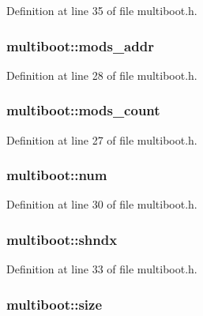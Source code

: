 Definition at line 35 of file multiboot.h.

\hypertarget{structmultiboot_ab498e400b86badc8cd9268e8b911341f}{
\subsubsection[{mods\_\-addr}]{ {\bf multiboot::mods\_\-addr}}}
\label{structmultiboot_ab498e400b86badc8cd9268e8b911341f}


Definition at line 28 of file multiboot.h.

\hypertarget{structmultiboot_abc3e364195feeaf327801564a4e49bd6}{
\subsubsection[{mods\_\-count}]{ {\bf multiboot::mods\_\-count}}}
\label{structmultiboot_abc3e364195feeaf327801564a4e49bd6}


Definition at line 27 of file multiboot.h.

\hypertarget{structmultiboot_ac5a780075eee3041b3c915d32f37d51a}{
\subsubsection[{num}]{ {\bf multiboot::num}}}
\label{structmultiboot_ac5a780075eee3041b3c915d32f37d51a}


Definition at line 30 of file multiboot.h.

\hypertarget{structmultiboot_abb0198fa44cac2b02164410e8cb26621}{
\subsubsection[{shndx}]{ {\bf multiboot::shndx}}}
\label{structmultiboot_abb0198fa44cac2b02164410e8cb26621}


Definition at line 33 of file multiboot.h.

\hypertarget{structmultiboot_ae6840a28f883874187013f4d7710f880}{
\subsubsection[{size}]{ {\bf multiboot::size}}}
\label{structmultiboot_ae6840a28f883874187013f4d7710f880}


